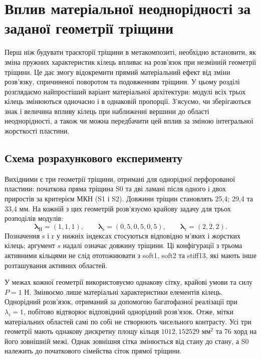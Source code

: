 \chapter{Вплив матеріальної неоднорідності за заданої геометрії тріщини}
\label{ch:fixed-crack}

Перш ніж будувати траєкторії тріщини в метакомпозиті, необхідно встановити, як зміна пружних характеристик кілець впливає на розв'язок при незмінній геометрії тріщини. Це дає змогу відокремити прямий матеріальний ефект від зміни розв'язку, спричиненої поворотом та подовженням тріщини. У цьому розділі розглядаємо найпростіший варіант матеріальної архітектури: модулі всіх трьох кілець змінюються одночасно і в однаковій пропорції. З'ясуємо, чи зберігаються знак і величина впливу кілець при наближенні вершини до області неоднорідності, а також чи можна передбачити цей вплив за зміною інтегральної жорсткості пластини.

\section{Схема розрахункового експерименту}
\label{sec:fixed-design}

Вихідними є три геометрії тріщини, отримані для однорідної перфорованої пластини: початкова пряма тріщина S0 та дві ламані після одного і двох приростів за критерієм МКН (S1 і S2). Довжини тріщин становлять 25,4; 29,4 та 33,4 мм. На кожній з цих геометрій розв'язуємо крайову задачу для трьох розподілів модулів:
\begin{equation}
 \boldsymbol\lambda_{\mathrm H}=(1,1,1),\qquad
 \boldsymbol\lambda_{\mathrm s}=(0{,}5,0{,}5,0{,}5),\qquad
 \boldsymbol\lambda_{\mathrm r}=(2,2,2).
 \label{eq:fixed-architectures}
\end{equation}
Позначення s і r у нижніх індексах стосуються відповідно м'яких і жорстких кілець; аргумент $s$ надалі означає довжину тріщини. Ці конфігурації з трьома активними кільцями не слід ототожнювати з soft1, soft2 та stiff13, які мають інше розташування активних областей.

У межах кожної геометрії використовуємо однакову сітку, крайові умови та силу $P=1$ Н. Змінюємо лише матеріальні характеристики елементів кілець. Однорідний розв'язок, отриманий за допомогою багатофазної реалізації при $\lambda_i=1$, побітово відтворює відповідний однорідний розв'язок. Отже, мітки матеріальних областей самі по собі не створюють чисельного контрасту. Усі три геометрії мають однакову дискретну площу кільця $1012{,}152529$ мм$^2$ та 76 хорд на його зовнішній межі. Однак зовнішня сітка змінюється від стану до стану, а S0 належить до початкового сімейства сіток прямої тріщини.

